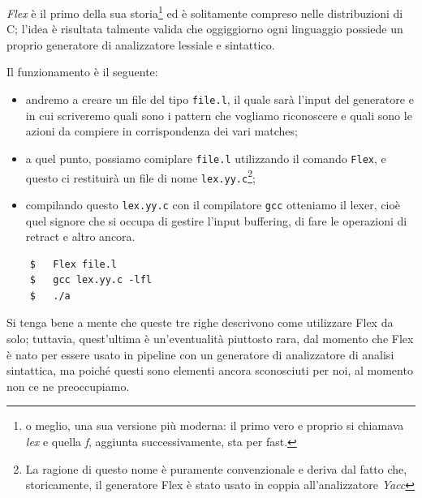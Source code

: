 \documentclass[class=book, crop=false, oneside, 12pt]{standalone}
\begin{document}
\emph{Flex} è il primo della sua storia\footnote{o meglio, una sua versione più moderna: il primo vero e proprio si chiamava \emph{lex} e quella \emph{f}, aggiunta successivamente, sta per fast.} ed è solitamente compreso nelle distribuzioni di C; l'idea è risultata talmente valida che oggiggiorno ogni linguaggio possiede un proprio generatore di analizzatore lessiale e sintattico.

Il funzionamento è il seguente: 
\begin{itemize}
    \item andremo a creare un file del tipo \texttt{file.l}, il quale sarà l'input del generatore e in cui scriveremo quali sono i pattern che vogliamo riconoscere e quali sono le azioni da compiere in corrispondenza dei vari matches;
    \item a quel punto, possiamo comiplare \texttt{file.l} utilizzando il comando \texttt{Flex}, e questo ci restituirà un file di nome \texttt{lex.yy.c}\footnote{La ragione di questo nome è puramente convenzionale e deriva dal fatto che, storicamente, il generatore Flex è stato usato in coppia all'analizzatore \emph{Yacc}};
    \item compilando questo \texttt{lex.yy.c} con il compilatore \texttt{gcc} otteniamo il lexer, cioè quel signore che si occupa di gestire l'input buffering, di fare le operazioni di retract e altro ancora.
\end{itemize} 
\begin{verbatim}
    $   Flex file.l
    $   gcc lex.yy.c -lfl
    $   ./a
\end{verbatim}
Si tenga bene a mente che queste tre righe descrivono come utilizzare Flex da solo; tuttavia, quest'ultima è un'eventualità piuttosto rara, dal momento che Flex è nato per essere usato in pipeline con un generatore di analizzatore di analisi sintattica, ma poiché questi sono elementi ancora sconosciuti per noi, al momento non ce ne preoccupiamo.
\end{document}
